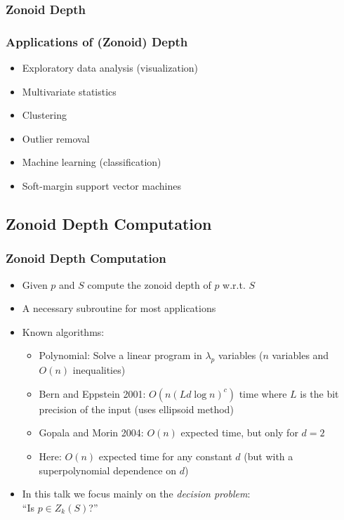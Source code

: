 \documentclass{beamer}
\begin{document}
\frame
{
    \frametitle{Zonoid Depth}
}

\frame
{
   \frametitle{Applications of (Zonoid) Depth}
   \begin{itemize}
    \item<1-> Exploratory data analysis (visualization)
    \item<2-> Multivariate statistics
    \item<3-> Clustering
    \item<4-> Outlier removal
    \item<5-> Machine learning (classification)
    \item<6-> Soft-margin support vector machines
   \end{itemize}
}


\subsection{Zonoid Depth Computation}
\frame
{
  \frametitle{Zonoid Depth Computation}
  \begin{itemize}
  \item<1-> Given $p$ and $S$ compute the zonoid depth of $p$
w.r.t. $S$
  \item<2-> A necessary subroutine for most applications
  \item<3-> Known algorithms:
     \begin{itemize}  
       \item<4-> Polynomial: Solve a linear program in $\lambda_p$ 
		variables ($n$ variables and $O(n)$ inequalities)
       \item<5-> Bern and Eppstein 2001:  $O(n(Ld\log n)^c)$ time where $L$
            is the bit precision of the input  (uses ellipsoid method)
       \item<6-> Gopala and Morin 2004: $O(n)$ expected time, but only
            for $d=2$
       \item<7-> Here: $O(n)$ expected time for any constant $d$ (but
            with a superpolynomial dependence on $d$)
     \end{itemize}
     \item<8-> In this talk we focus mainly on the \emph{decision 
          problem}:  \\ ``Is $p\in Z_k(S)$?''
  \end{itemize}
}
\end{document}
